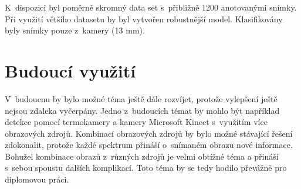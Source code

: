 K~dispozici byl poměrně skromný data set s~přibližně 1200 anotovanými snímky. Při využití většího datasetu by byl vytvořen robustnější model. Klasifikovány byly snímky pouze z~kamery (13 mm).

\section{Budoucí využití}
V~budoucnu by bylo možné téma ještě dále rozvíjet, protože vylepšení ještě nejsou zdaleka vyčerpány. Jedno z~budoucích témat by mohlo být například detekce pomocí termokamery a kamery Microsoft Kinect s~využitím více obrazových zdrojů. Kombinací obrazových zdrojů by bylo možné stávající řešení zdokonalit, protože každé spektrum přináší o~snímaném obrazu nové informace. Bohužel kombinace obrazů z~různých zdrojů je velmi obtížné téma a přináší s~sebou spoustu dalších komplikací. Toto téma by se tedy hodilo převážně pro diplomovou práci.